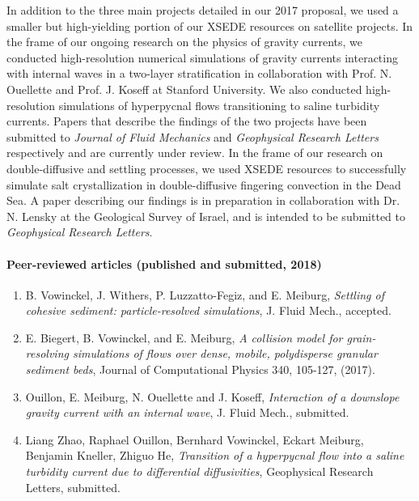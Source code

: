 \documentclass[11pt]{article}
\begin{document}

In addition to the three main projects detailed in our 2017 proposal, we used a smaller but high-yielding portion of our XSEDE resources on satellite projects. In the frame of our ongoing research on the physics of gravity currents, we conducted high-resolution numerical simulations of gravity currents interacting with internal waves in a two-layer stratification in collaboration with Prof. N. Ouellette and Prof. J. Koseff at Stanford University. We also conducted high-resolution simulations of hyperpycnal flows transitioning to saline turbidity currents. Papers that describe the findings of the two projects have been submitted to \emph{Journal of Fluid Mechanics} and \emph{Geophysical Research Letters} respectively and are currently under review. In the frame of our research on double-diffusive and settling processes, we used XSEDE resources to successfully simulate salt crystallization in double-diffusive fingering convection in the Dead Sea. A paper describing our findings is in preparation in collaboration with Dr. N. Lensky at the Geological Survey of Israel, and is intended to be submitted to \emph{Geophysical Research Letters}.    
% 

\paragraph*{Peer-reviewed articles (published and submitted, 2018) }  
  \begin{enumerate}
    \item B. Vowinckel, J. Withers, P. Luzzatto-Fegiz, and E. Meiburg, \textit{Settling of cohesive sediment: particle-resolved simulations}, J. Fluid Mech., accepted.
    
    \item E. Biegert, B. Vowinckel, and E. Meiburg, \textit{A collision model for grain-resolving simulations of flows over dense, mobile, polydisperse granular sediment beds}, Journal of Computational Physics 340, 105-127, (2017).

    \item Ouillon, E. Meiburg, N. Ouellette and J. Koseff, \textit{Interaction of a downslope gravity current with an internal wave}, J. Fluid Mech., submitted.
    \item Liang Zhao, Raphael Ouillon, Bernhard Vowinckel, Eckart Meiburg, Benjamin Kneller, Zhiguo He, \textit{Transition of a hyperpycnal flow into a saline turbidity current due to differential diffusivities}, Geophysical Research Letters, submitted.


\end{enumerate}
  
\end{document}
